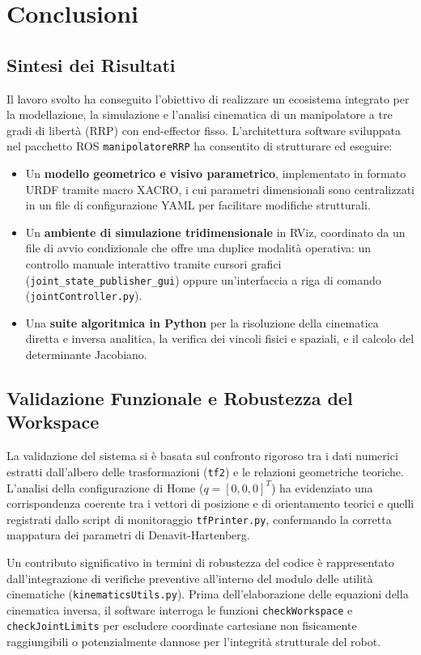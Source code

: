 \documentclass[11pt, a4paper]{report}
\begin{document}


\chapter{Conclusioni}
\label{chap:conclusioni}

\section{Sintesi dei Risultati}
Il lavoro svolto ha conseguito l'obiettivo di realizzare un ecosistema integrato per la modellazione, la simulazione e l'analisi cinematica di un manipolatore a tre gradi di libertà (RRP) con end-effector fisso. L'architettura software sviluppata nel pacchetto ROS \texttt{manipolatoreRRP} ha consentito di strutturare ed eseguire:
\begin{itemize}
    \item Un \textbf{modello geometrico e visivo parametrico}, implementato in formato URDF tramite macro XACRO, i cui parametri dimensionali sono centralizzati in un file di configurazione YAML per facilitare modifiche strutturali.
    \item Un \textbf{ambiente di simulazione tridimensionale} in RViz, coordinato da un file di avvio condizionale che offre una duplice modalità operativa: un controllo manuale interattivo tramite cursori grafici (\texttt{joint\_state\_publisher\_gui}) oppure un'interfaccia a riga di comando (\texttt{jointController.py}).
    \item Una \textbf{suite algoritmica in Python} per la risoluzione della cinematica diretta e inversa analitica, la verifica dei vincoli fisici e spaziali, e il calcolo del determinante Jacobiano.
\end{itemize}

\section{Validazione Funzionale e Robustezza del Workspace}
La validazione del sistema si è basata sul confronto rigoroso tra i dati numerici estratti dall'albero delle trasformazioni (\texttt{tf2}) e le relazioni geometriche teoriche. L'analisi della configurazione di Home (\(q = [0, 0, 0]^T\)) ha evidenziato una corrispondenza coerente tra i vettori di posizione e di orientamento teorici e quelli registrati dallo script di monitoraggio \texttt{tfPrinter.py}, confermando la corretta mappatura dei parametri di Denavit-Hartenberg.

Un contributo significativo in termini di robustezza del codice è rappresentato dall'integrazione di verifiche preventive all'interno del modulo delle utilità cinematiche (\texttt{kinematicsUtils.py}). Prima dell'elaborazione delle equazioni della cinematica inversa, il software interroga le funzioni \texttt{checkWorkspace} e \texttt{checkJointLimits} per escludere coordinate cartesiane non fisicamente raggiungibili o potenzialmente dannose per l'integrità strutturale del robot.
\end{document}
